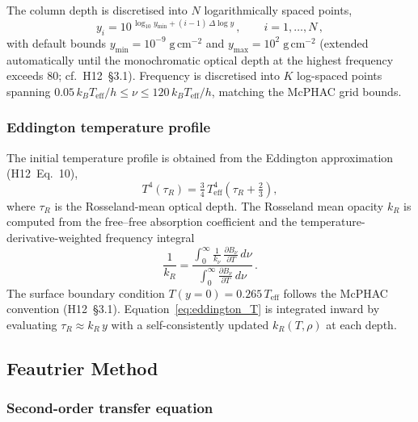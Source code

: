 The column depth is discretised into $N$ logarithmically spaced points,
\begin{equation}
  y_i = 10^{\,\log_{10}y_\mathrm{min} + (i-1)\,\Delta\log y}\,,\qquad
  i=1,\dots,N\,,
\end{equation}
with default bounds $y_\mathrm{min}=10^{-9}\;\mathrm{g\,cm^{-2}}$ and $y_\mathrm{max}=10^{2}\;\mathrm{g\,cm^{-2}}$ (extended automatically until the monochromatic optical depth at the highest frequency exceeds 80; cf.\ H12~\S3.1). Frequency is discretised into $K$ log-spaced points spanning $0.05\,k_BT_\mathrm{eff}/h \le \nu \le 120\,k_BT_\mathrm{eff}/h$, matching the McPHAC grid bounds.

\subsubsection{Eddington temperature profile}

The initial temperature profile is obtained from the Eddington approximation (H12~Eq.~10),
\begin{equation}
  T^4(\tau_R) = \tfrac{3}{4}\,T_\mathrm{eff}^4\!\left(\tau_R + \tfrac{2}{3}\right),
  \label{eq:eddington_T}
\end{equation}
where $\tau_R$ is the Rosseland-mean optical depth. The Rosseland mean opacity $k_R$ is computed from the free--free absorption coefficient and the temperature-derivative-weighted frequency integral
\begin{equation}
  \frac{1}{k_R}
  = \frac{\int_0^\infty \frac{1}{k_\nu}\,\frac{\partial B_\nu}{\partial T}\,d\nu}
         {\int_0^\infty \frac{\partial B_\nu}{\partial T}\,d\nu}\,.
\end{equation}
The surface boundary condition $T(y\!=\!0) = 0.265\,T_\mathrm{eff}$ follows the McPHAC convention (H12~\S3.1). Equation~\eqref{eq:eddington_T} is integrated inward by evaluating $\tau_R \approx k_R\,y$ with a self-consistently updated $k_R(T,\rho)$ at each depth.

\subsection{Feautrier Method}
\label{sec:feautrier}

\subsubsection{Second-order transfer equation}

